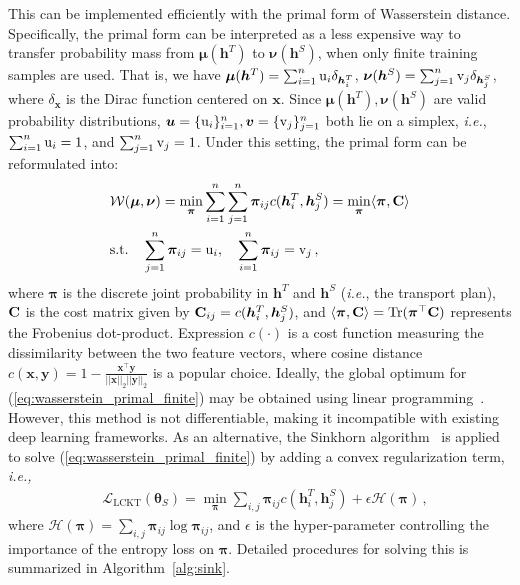 \documentclass[final]{cvpr}
\def\ervu{{\textnormal{u}}}
\def\ervv{{\textnormal{v}}}
\def\vv{{\bm{v}}}
\newcommand{\Cmat}{{\bf C}}
\newcommand{\hv}{{\boldsymbol h}}
\newcommand{\uv}{{\boldsymbol u}}
\newcommand{\xv}{{\boldsymbol x}}
\newcommand{\yv}{{\boldsymbol y}}
\newcommand{\thetav}{{\boldsymbol \theta}}
\newcommand{\muv}{{\boldsymbol \mu}}
\newcommand{\nuv}{{\boldsymbol \nu}}
\newcommand{\piv}{{\boldsymbol \pi}}
\theoremstyle{definition}
\begin{document}
This can be implemented efficiently with the primal form of Wasserstein distance. Specifically, the primal form can be interpreted as a less expensive way to transfer probability mass from $\muv(\hv^T)$ to $\nuv(\hv^S)$, when only finite training samples are used. That is, we have $\muv(\hv^T) = \sum_{i=1}^n \ervu_i\delta_{\hv^T_i}$, $\nuv(\hv^S) = \sum_{j=1}^n \ervv_j\delta_{\hv^S_j}$, where $\delta_{\xv}$ is the Dirac function centered on $\xv$. Since $\muv(\hv^T), \nuv(\hv^S)$ are valid probability distributions, $\uv=\{\ervu_i\}_{i=1}^n, \vv=\{\ervv_j\}_{j=1}^n$ both lie on a simplex, \emph{i.e.}, $\sum_{i=1}^n \ervu_i = 1$, and $\sum_{j=1}^n \ervv_j = 1$. 
Under this setting, 
the primal form can be reformulated into:
\begin{align}\label{eq:wasserstein_primal_finite}
    & \mathcal{W}(\muv, \nuv) = \min_{\piv} \sum_{i=1}^n \sum_{j=1}^n \piv_{ij} c(\hv^T_i, \hv^S_j) = \min_{\piv} \langle\piv, \Cmat \rangle \nonumber\\
    & \mathrm{s.t. \quad} \sum_{j=1}^n \piv_{ij} = \ervu_i, \quad \sum_{i=1}^n \piv_{ij} = \ervv_j\,,
\end{align}
where $\piv$ is the discrete joint probability in $\hv^T$ and $\hv^S$ (\emph{i.e.}, the transport plan), $\Cmat$ is the cost matrix given by $\Cmat_{ij}=c(\hv_i^T,\hv_j^S)$, and $\langle \piv, \Cmat \rangle = \mathrm{Tr}(\piv^\top \Cmat)$ represents the Frobenius dot-product. Expression $c(\cdot)$ is a cost function measuring the dissimilarity between the two feature vectors, where cosine distance $c(\xv,\yv)=1-\frac{\xv^\top\yv}{||\xv||_2||\yv||_2}$ is a popular choice.
Ideally, the global optimum for (\ref{eq:wasserstein_primal_finite}) may be obtained using linear programming~\cite{villani2008optimal, peyre2017computational}. However, this method is not differentiable, making it incompatible with existing deep learning frameworks. 
As an alternative, the Sinkhorn algorithm~\cite{cuturi2013sinkhorn} is applied to solve (\ref{eq:wasserstein_primal_finite}) by adding a convex regularization term, \emph{i.e.,}
\begin{align}\label{eq:sinkhorn_finite}
    & \mathcal{L}_{\mathrm{LCKT}}(\thetav_S) = \min_{\piv} \sum_{i,j} \piv_{ij} c(\hv^T_i, \hv^S_j) + \epsilon \mathcal{H}(\piv)\,,
\end{align}
where $\mathcal{H}(\bm \pi) = \sum_{i,j} \piv_{ij} \log \piv_{ij}$, and $\epsilon$ is the hyper-parameter controlling the importance of the entropy loss on $\piv$. 
Detailed procedures for solving this is summarized in Algorithm~\ref{alg:sink}.
\end{document}
